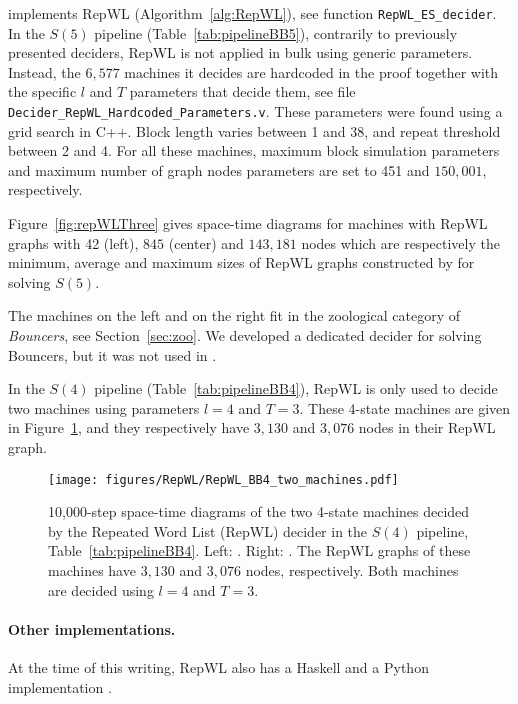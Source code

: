 

\CoqBB implements RepWL (Algorithm~\ref{alg:RepWL}), see function \texttt{RepWL\_ES\_decider}. In the $S(5)$ pipeline (Table~\ref{tab:pipelineBB5}), contrarily to previously presented deciders, RepWL is not applied in bulk using generic parameters. Instead, the ${6,577}$ machines it decides are hardcoded in the proof together with the specific $l$ and $T$ parameters that decide them, see file \texttt{Decider\_RepWL\_Hardcoded\_Parameters.v}. These parameters were found using a grid search in C++. Block length varies between 1 and 38, and repeat threshold between 2 and 4. For all these machines, maximum block simulation parameters and maximum number of graph nodes parameters are set to 451 and ${150,001}$, respectively.


Figure~\ref{fig:repWLThree} gives space-time diagrams for machines with RepWL graphs with 42 (left), ${845}$ (center) and $143{,}181$ nodes which are respectively the minimum, average and maximum sizes of RepWL graphs constructed by \CoqBB for solving $S(5)$.

The machines on the left and on the right fit in the zoological category of \textit{Bouncers}, see Section~\ref{sec:zoo}. We developed a dedicated decider for solving Bouncers, but it was not used in \CoqBB \cite{bbchallenge_part1}.

In the $S(4)$ pipeline (Table~\ref{tab:pipelineBB4}), RepWL is only used to decide two machines using parameters $l=4$ and $T=3$. These 4-state machines are given in Figure~\ref{fig:RepWLBB4}, and they respectively have $3{,}130$ and $3{,}076$ nodes in their RepWL graph.

\begin{figure}
    \centering
    \texttt{[image: figures/RepWL/RepWL\_BB4\_two\_machines.pdf]}
    \caption{10,000-step space-time diagrams of the two 4-state machines decided by the Repeated Word List (RepWL) decider in the $S(4)$ pipeline, Table~\ref{tab:pipelineBB4}. Left: {\small {}}. Right: {\small {}}. The RepWL graphs of these machines have $3{,}130$ and $3{,}076$ nodes, respectively. Both machines are decided using $l=4$ and $T=3$.
    }\label{fig:RepWLBB4}
\end{figure}

\paragraph{Other implementations.} At the time of this writing, RepWL also has a Haskell and a Python implementation \cite{RepWL_haskell,RepWL_python}.